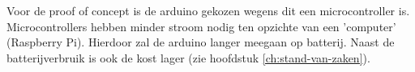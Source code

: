 \chapter{}
\label{ch:corpus}

\section{}
\label{ch:proof-of-concept}

Voor de proof of concept is de arduino gekozen wegens dit een microcontroller is. Microcontrollers hebben minder stroom nodig ten opzichte van een 'computer' (Raspberry Pi). Hierdoor zal de arduino langer meegaan op batterij. Naast de batterijverbruik is ook de kost lager (zie hoofdstuk \ref{ch:stand-van-zaken}).

